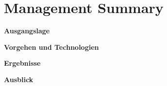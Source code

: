 
\chapter*{Management Summary}



\textbf{Ausgangslage}

\textbf{Vorgehen und Technologien}

\textbf{Ergebnisse}

\textbf{Ausblick}